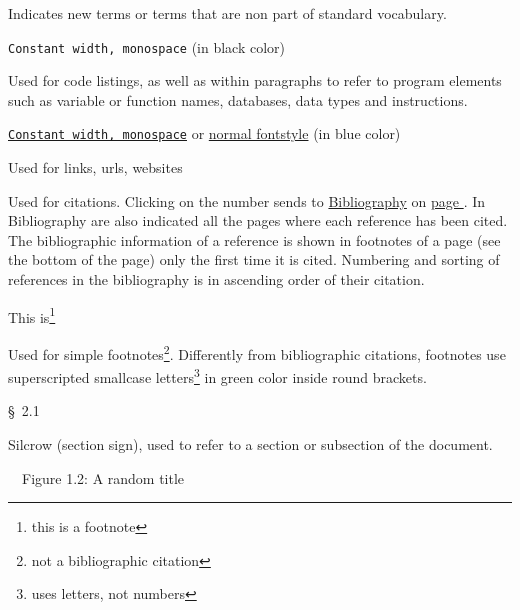 \noindent Indicates new terms or terms that are non part of standard vocabulary.
\bigskip

\noindent\texttt{Constant width, monospace} (in black color)

\noindent Used for code listings, as well as within paragraphs to refer to program elements such as variable or function names, databases, data types and instructions.
\bigskip

\noindent\href{https://en.wikipedia.org/wiki/URL}{\texttt{Constant width, monospace}} or \href{https://en.wikipedia.org/wiki/URL}{normal fontstyle} (in blue color)

Used for links, urls, websites
\bigskip

\noindent{}

\noindent Used for citations.
Clicking on the number sends to \hyperref[Backmatter:Bibliography]{Bibliography} on \hyperref[Backmatter:Bibliography]{page \pageref{Backmatter:Bibliography}}.
In Bibliography are also indicated all the pages where each reference has been cited.
The bibliographic information of a reference is shown in footnotes of a page (see the bottom of the page) only the first time it is cited. Numbering and sorting of references in the bibliography is in ascending order of their citation.
\bigskip

\noindent This is\footnote{this is a footnote}

\noindent Used for simple footnotes\footnote{not a bibliographic citation}.
Differently from bibliographic citations, footnotes use superscripted smallcase letters\footnote{uses letters, not numbers} in green color inside round brackets.
\bigskip



\noindent\S\ 2.1

\noindent Silcrow (section sign), used to refer to a section or subsection of the document.
\bigskip



\noindent\hyperref[Listoffigures]{\footnotesize\faListUl}\ \ Figure 1.2: A random title

